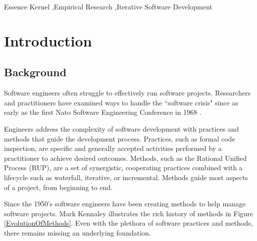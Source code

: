 \documentclass[preprint,12pt,3p]{elsarticle}
\begin{document}
\begin{frontmatter}
\begin{abstract}

\end{abstract}

\begin{keyword}
Essence Kernel \sep Empirical Research \sep Iterative Software Development
\end{keyword}

\end{frontmatter}


\section{Introduction}

\subsection{Background}
Software engineers often struggle to effectively run software projects. Researchers and practitioners have examined ways to handle the ``software crisis" since as early as the first Nato Software Engineering Conference in 1968 \cite{Naur1969}. 

Engineers address the complexity of software development with practices and methods that guide the development process. Practices, such as formal code inspection, are specific and generally accepted activities performed by a practitioner to achieve desired outcomes. Methods, such as the Rational Unified Process (RUP), are a set of synergistic, cooperating practices combined with a lifecycle such as waterfall, iterative, or incremental. Methods guide most aspects of a project, from beginning to end.

Since the 1950's software engineers have been creating methods to help manage software projects. Mark Kennaley illustrates the rich history of methods \cite{SDLC} in Figure \ref{EvolutionOfMethods}. Even with the plethora of software practices and methods, there remains missing an underlying foundation.
\end{document}

